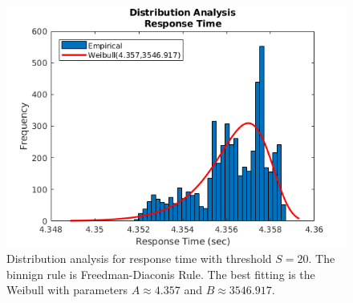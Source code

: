 \begin{figure}
	\includegraphics[width=\columnwidth]{fig/evaluation-distribution-analysis-response-time}
	\caption{Distribution analysis for response time with threshold $S=20$. The binnign rule is Freedman-Diaconis Rule. The best fitting is the Weibull with parameters $A\approx4.357$ and $B\approx3546.917$.}
	\label{fig:evaluation-distribution-analysis-response-time}
\end{figure}